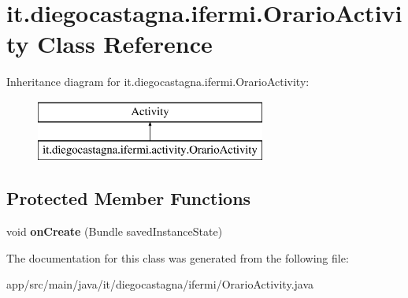 \hypertarget{classit_1_1diegocastagna_1_1ifermi_1_1_orario_activity}{}\section{it.\+diegocastagna.\+ifermi.\+Orario\+Activity Class Reference}
\label{classit_1_1diegocastagna_1_1ifermi_1_1_orario_activity}
Inheritance diagram for it.\+diegocastagna.\+ifermi.\+Orario\+Activity\+:\begin{figure}[H]
\begin{center}
\leavevmode
\includegraphics[height=2.000000cm]{classit_1_1diegocastagna_1_1ifermi_1_1_orario_activity}
\end{center}
\end{figure}
\subsection*{Protected Member Functions}
\begin{DoxyCompactItemize}
\item 
\mbox{\label{classit_1_1diegocastagna_1_1ifermi_1_1_orario_activity_a9aadf6aa93d2a0218b332b33c17f8bec}} 
void {\bfseries on\+Create} (Bundle saved\+Instance\+State)
\end{DoxyCompactItemize}


The documentation for this class was generated from the following file\+:\begin{DoxyCompactItemize}
\item 
app/src/main/java/it/diegocastagna/ifermi/Orario\+Activity.\+java\end{DoxyCompactItemize}
